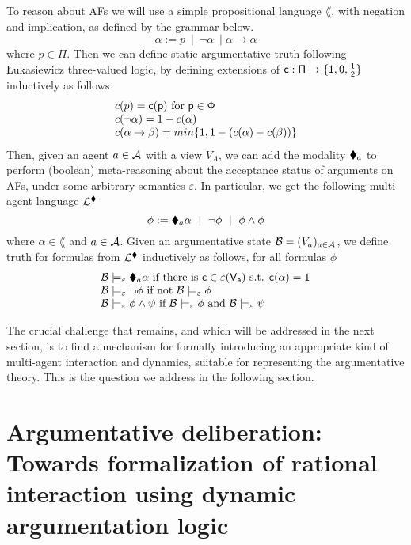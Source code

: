 \documentclass{article}
\newcommand{\clab}{\sf c}
\newcommand{\views}{\mathcal B}
\newcommand{\sem}{\varepsilon}
\begin{document}
To reason about AFs we will use a simple propositional language $\lang$, with negation and implication, as defined by the grammar below.
$$
\alpha := p \ \mid \ \neg \alpha \ \mid \alpha \to \alpha 
$$
where $p \in \Pi$. Then we can define static argumentative truth following {\L}ukasiewicz three-valued logic, by defining extensions of $\clab: \Pi \to \three$ inductively as follows
\begin{equation}\label{eq:lsem}
\begin{array}{l}
\overline \clab(p) = \clab(p) \text{ for } p \in \Phi \\
\overline \clab(\neg \alpha) = 1 - \overline \clab(\alpha) \\
\overline \clab(\alpha \to \beta) = min\{1,1-(\overline \clab(\alpha) - \overline \clab(\beta))\}
\end{array}
\end{equation}
Then, given an agent $a \in \mathcal A$ with a view $V_A$, we can add the modality $\blacklozenge_a$ to perform (boolean) meta-reasoning about the acceptance status of arguments on AFs, under some arbitrary semantics $\sem$. In particular, we get the following multi-agent language $\mathcal L^{\blacklozenge}$
$$
\phi := \blacklozenge_a \alpha \ \mid \ \neg \phi \ \mid \ \phi \land \phi $$ where $\alpha \in \lang$ and $a \in \mathcal A$. Given an argumentative state $\views = (V_a)_{a\in \agents}$, we define truth for formulas from $\mathcal L^{\blacklozenge}$ inductively as follows, for all formulas $\phi$
\begin{equation}\label{eq:asem}
\begin{array}{l}
\views \models_\sem \cdia_a \alpha \text{ if there is } \clab \in \sem(V_a) \text{ s.t. } \overline \clab(\alpha) = 1 \\
\views \models_\sem \neg \phi \text{ if not } \views \models_\sem \phi \\
\views \models_\sem \phi \land \psi \text{ if } \views \models_\sem \phi \text{ and } \views \models_\sem \psi 
\end{array}
\end{equation}

The crucial challenge that remains, and which will be addressed in the next section, is to find a mechanism for formally introducing an appropriate kind of multi-agent interaction and dynamics, suitable for representing the argumentative theory. This is the question we address in the following section.

\section{Argumentative deliberation: Towards formalization of rational interaction using dynamic argumentation logic}\label{sec:ddl}
\end{document}
